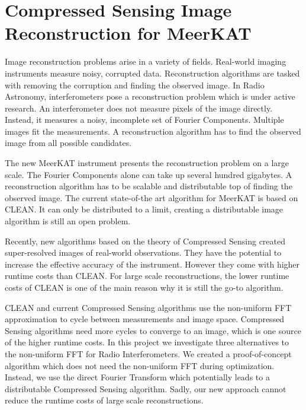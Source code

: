 \section{Compressed Sensing Image Reconstruction for MeerKAT} \label{intro}
Image reconstruction problems arise in a variety of fields. Real-world imaging instruments measure noisy, corrupted data. Reconstruction algorithms are tasked with removing the corruption and finding the observed image. In Radio Astronomy, interferometers pose a reconstruction problem which is under active research. An interferometer does not measure pixels of the image directly. Instead, it measures a noisy, incomplete set of Fourier Components. Multiple images fit the measurements. A reconstruction algorithm has to find the observed image from all possible candidates.

The new MeerKAT instrument presents the reconstruction problem on a large scale. The Fourier Components alone can take up several hundred gigabytes. A reconstruction algorithm has to be scalable and distributable top of finding the observed image. The current state-of-the art algorithm for MeerKAT is based on CLEAN\cite{rich2008multi, rau2011multi}. It can only be distributed to a limit, creating a distributable image algorithm is still an open problem.

Recently, new algorithms based on the theory of Compressed Sensing\cite{candes2006robust, donoho2006compressed} created super-resolved images of real-world observations\cite{girard2015sparse, dabbech2018cygnus}. They have the potential to increase the effective accuracy of the instrument. However they come with higher runtime costs than CLEAN. For large scale reconstructions, the lower runtime costs of CLEAN is one of the main reason why it is still the go-to algorithm.

CLEAN and current Compressed Sensing algorithms use the non-uniform FFT approximation\cite{kunisnonequispaced, pratley2017robust} to cycle between measurements and image space. Compressed Sensing algorithms need more cycles to converge to an image, which is one source of the higher runtime costs. In this project we investigate three alternatives to the non-uniform FFT for Radio Interferometers. We created a proof-of-concept algorithm which does not need the non-uniform FFT during optimization. Instead, we use the direct Fourier Transform which potentially leads to a distributable Compressed Sensing algorithm. Sadly, our new approach cannot reduce the runtime costs of large scale reconstructions.

